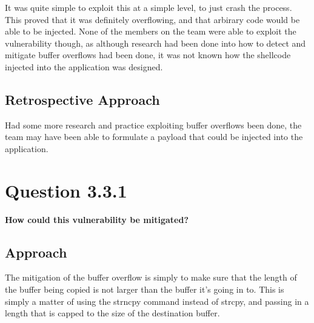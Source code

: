 It was quite simple to exploit this at a simple level, to just crash the
process. This proved that it was definitely overflowing, and that arbirary
code would be able to be injected. None of the members on the team were
able to exploit the vulnerability though, as although research had been done
into how to detect and mitigate buffer overflows had been done, it was not
known how the shellcode injected into the application was designed.

\subsection{Retrospective Approach}
Had some more research and practice exploiting buffer overflows been done, the
team may have been able to formulate a payload that could be injected into
the application.

\section{Question 3.3.1}
\textbf{How could this vulnerability be mitigated?}
\subsection{Approach}
The mitigation of the buffer overflow is simply to make sure that the length
of the buffer being copied is not larger than the buffer it's going in to.
This is simply a matter of using the strncpy command instead of strcpy, and
passing in a length that is capped to the size of the destination buffer.
